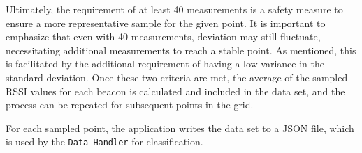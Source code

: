 Ultimately, the requirement of at least 40 measurements is a safety measure to ensure a more representative sample for the given point. 
It is important to emphasize that even with 40 measurements, deviation may still fluctuate, necessitating additional measurements to reach a stable point. 
As mentioned, this is facilitated by the additional requirement of having a low variance in the standard deviation. 
Once these two criteria are met, the average of the sampled RSSI values for each beacon is calculated and included in the data set, and the process can be repeated for subsequent points in the grid.

For each sampled point, the application writes the data set to a JSON file, which is used by the \texttt{Data Handler} for classification.